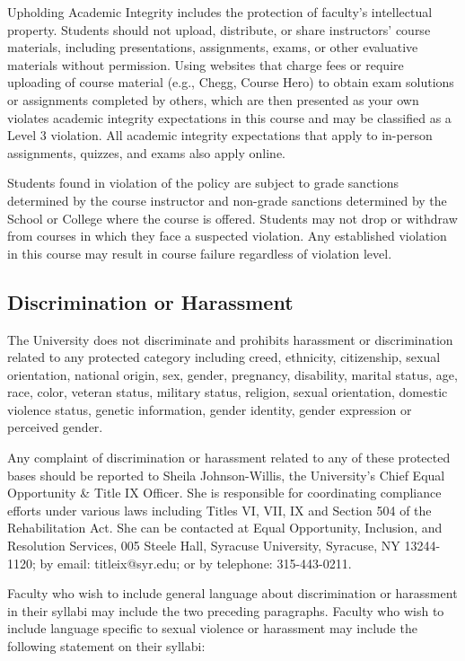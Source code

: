 \documentclass[12pt]{article}
\begin{document}
Upholding Academic Integrity includes the protection of faculty’s intellectual property. Students should not upload, distribute, or share instructors’ course materials, including presentations, assignments, exams, or other evaluative materials without permission. Using websites that charge fees or require uploading of course material (e.g., Chegg, Course Hero) to obtain exam solutions or assignments completed by others, which are then presented as your own violates academic integrity expectations in this course and may be classified as a Level 3 violation. All academic integrity expectations that apply to in-person assignments, quizzes, and exams also apply online.

Students found in violation of the policy are subject to grade sanctions determined by the course instructor and non-grade sanctions determined by the School or College where the course is offered. Students may not drop or withdraw from courses in which they face a suspected violation. Any established violation in this course may result in course failure regardless of violation level.

\subsection*{Discrimination or Harassment}

The University does not discriminate and prohibits harassment or discrimination related to any protected category including creed, ethnicity, citizenship, sexual orientation, national origin, sex, gender, pregnancy, disability, marital status, age, race, color, veteran status, military status, religion, sexual orientation, domestic violence status, genetic information, gender identity, gender expression or perceived gender.

Any complaint of discrimination or harassment related to any of these protected bases should be reported to Sheila Johnson-Willis, the University’s Chief Equal Opportunity \& Title IX Officer. She is responsible for coordinating compliance efforts under various laws including Titles VI, VII, IX and Section 504 of the Rehabilitation Act. She can be contacted at Equal Opportunity, Inclusion, and Resolution Services, 005 Steele Hall, Syracuse University, Syracuse, NY 13244-1120; by email: titleix@syr.edu; or by telephone: 315-443-0211.

Faculty who wish to include general language about discrimination or harassment in their syllabi may include the two preceding paragraphs. Faculty who wish to include language specific to sexual violence or harassment may include the following statement on their syllabi:
\end{document}

